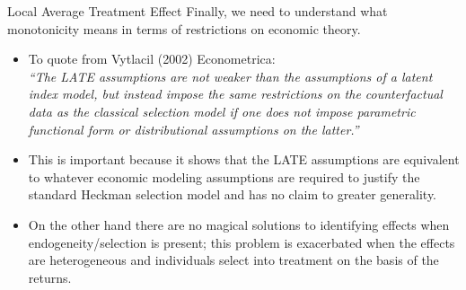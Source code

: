 \documentclass[xcolor=pdftex,dvipsnames,table,mathserif,aspectratio=169]{beamer}
\begin{document}
\begin{frame}{Local Average Treatment Effect}
Finally, we need to understand what monotonicity means in terms of restrictions on economic theory. 
\begin{itemize}
\item To quote from Vytlacil (2002) Econometrica:\\
\emph{ ``The LATE assumptions are not weaker than the assumptions of a latent index model, but instead impose the same restrictions on the counterfactual data as the classical selection model if one does not impose parametric functional form or distributional assumptions on the latter.''}
\item This is important because it shows that the LATE assumptions are equivalent to whatever economic modeling assumptions are required to justify the standard Heckman selection model and has no claim to greater generality.
\item On the other hand there are no magical solutions to identifying effects when endogeneity/selection is present; this problem is exacerbated when the effects are heterogeneous and individuals select into treatment on the basis of the returns.
\end{itemize}
\end{frame}
\end{document}
